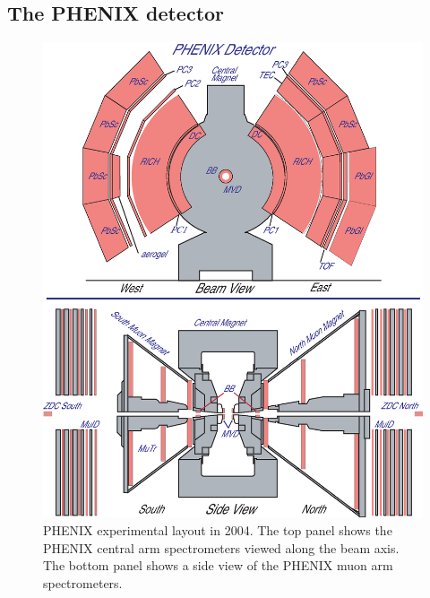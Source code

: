 \documentclass[aps,prc,superscriptaddress,showpacs,floatfix,twocolumn]{revtex4}
\begin{document}
\subsection{The PHENIX detector}
\begin{figure}[htbp]
\includegraphics[width=1.0\linewidth]{Phenix_2004.eps}
\caption{PHENIX experimental layout in 2004. The top panel shows 
the PHENIX central arm spectrometers viewed along the beam axis. 
The bottom panel shows a side view of the PHENIX muon arm 
spectrometers.}
\label{fig:phenix}
\end{figure}
\end{document}
